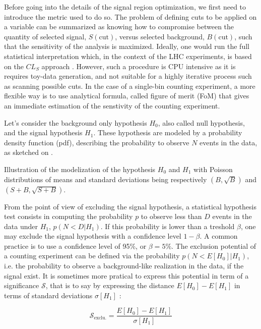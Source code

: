    Before going into the details of the signal region optimization, we first need to
    introduce the metric used to do so. The problem of defining cuts to be applied on a
    variable can be summarized as knowing how to compromise between the quantity of
    selected signal, $S(\text{cut})$, versus selected background, $B(\text{cut})$, such
    that the sensitivity of the analysis is maximized. Ideally, one would run the full
    statistical interpretation which, in the context of the LHC experiments, is based
    on the $CL_S$ approach . However, such a procedure is CPU intensive as it is
    requires toy-data generation, and not suitable for a highly iterative process such
    as scanning possible cuts. In the case of a single-bin counting experiment, a more
    flexible way is to use analytical formula, called figure of merit (FoM) that gives an
    immediate estimation of the senstivity of the counting experiment.

    Let's consider the background only hypothesis $H_0$, also called null hypothesis,
    and the signal hypothesis $H_1$. These hypothesis are modeled by a probability density
    function (pdf), describing the probability to observe $N$ events in the data, as
    sketched on .

                 {Illustration of the modelization of the hypothesis $H_0$ and $H_1$ with
                 Poisson distributions of means and standard deviations being respectively
                 $(B,\sqrt{B})$ and $(S+B,\sqrt{S+B})$. }

    From the point of view of excluding the signal hypothesis, a statistical hypothesis
    test consists in computing the probability $p$ to observe less than $D$ events in the
    data under $H_1$, $p(N < D|H_1)$. If this probability is lower than a treshold
    $\beta$, one may exclude the signal hypothesis with a confidence level $1-\beta$. A
    common practice is to use a confidence level of 95\%, or $\beta = 5\%$. The exclusion
    potential of a counting experiment can be defined via the probability $p(N < E[H_0]|H_1)$,
    i.e. the probability to observe a background-like realization in the data, if the
    signal exist. It is sometimes more pratical to express this potential in term of a
    significance $\mathcal{S}$, that is to say by expressing the distance $E[H_0] -
    E[H_1]$ in terms of standard deviations $\sigma[H_1]$ :

    $$ \mathcal{S}_\text{exclu.} = \frac{E[H_0] - E[H_1]}{\sigma[H_1]}$$


